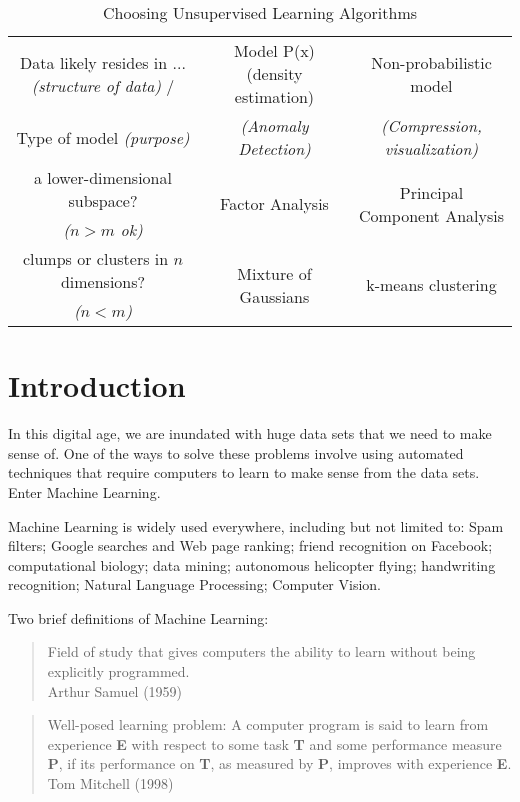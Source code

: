 \documentclass[letterpaper,10pt]{article}
\begin{document}
\begin{table}[hbtp]
\center
\begin{tabular}{c|c|c}
Data likely resides in ... \textit{(structure of data)} /  & Model P(x) (density estimation) & Non-probabilistic model \\
Type of model \textit{(purpose)} & \textit{(Anomaly Detection)} & \textit{(Compression, visualization)} \\
\hline
 a lower-dimensional subspace? & \multirow{2}{*}{Factor Analysis} & \multirow{2}{*}{Principal Component Analysis} \\
\textit{($n>m$ ok)} & & \\
 \hline
clumps or clusters in $n$ dimensions? & \multirow{2}{*}{Mixture of Gaussians} & \multirow{2}{*}{k-means clustering} \\
\textit{($n<m$)} & & \\
\end{tabular}
\caption{Choosing Unsupervised Learning Algorithms} \label{UnsupervisedSummary}
\end{table}


\section{Introduction}

In this digital age, we are inundated with huge data sets that we need to make sense of. One of the ways to solve these problems involve using automated techniques that require computers to learn to make sense from the data sets. Enter Machine Learning.

Machine Learning is widely used everywhere, including but not limited to: Spam filters; Google searches and Web page ranking; friend recognition on Facebook; computational biology; data mining; autonomous helicopter flying; handwriting recognition; Natural Language Processing; Computer Vision.

Two brief definitions of Machine Learning:
\begin{quote}
Field of study that gives computers the ability to learn without being explicitly programmed.\\
Arthur Samuel (1959)
\end{quote}

\begin{quote}
Well-posed learning problem: A computer program is said to learn from experience \textbf{E} with respect to some task \textbf{T} and some performance measure \textbf{P}, if its performance on \textbf{T}, as measured by \textbf{P}, improves with experience \textbf{E}. \\
Tom Mitchell (1998) 
\end{quote}
\end{document}
